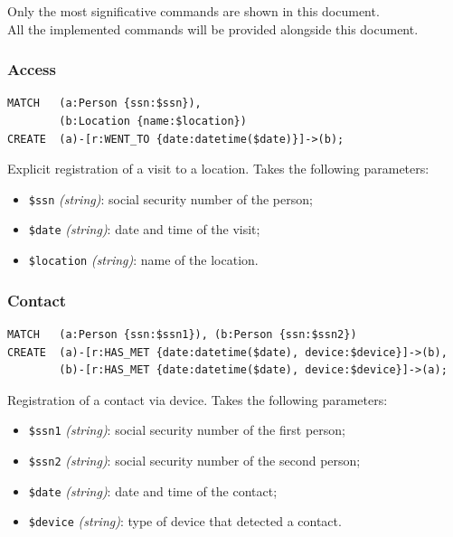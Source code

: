 \documentclass[12pt, a4paper]{article}
\begin{document}
Only the most significative commands are shown in this document. \\
All the implemented commands will be provided alongside this document.

\subsubsection{Access}

\begin{tcolorbox}[fontupper=\scriptsize]
    \begin{verbatim}
MATCH   (a:Person {ssn:$ssn}),
        (b:Location {name:$location})
CREATE  (a)-[r:WENT_TO {date:datetime($date)}]->(b);  
    \end{verbatim}
\end{tcolorbox}

\noindent %
Explicit registration of a visit to a location.
Takes the following parameters: 

\begin{itemize}
    \item \texttt{\$ssn} \emph{(string)}: social security number of the person;
    \item \texttt{\$date} \emph{(string)}: date and time of the visit;
    \item \texttt{\$location} \emph{(string)}: name of the location.
\end{itemize}

\subsubsection{Contact}

\begin{tcolorbox}[fontupper=\scriptsize]
    \begin{verbatim}
MATCH   (a:Person {ssn:$ssn1}), (b:Person {ssn:$ssn2})
CREATE  (a)-[r:HAS_MET {date:datetime($date), device:$device}]->(b), 
        (b)-[r:HAS_MET {date:datetime($date), device:$device}]->(a);
    \end{verbatim}
\end{tcolorbox}

\noindent %
Registration of a contact via device.
Takes the following parameters: 

\begin{itemize}
    \item \texttt{\$ssn1} \emph{(string)}: social security number of the 
        first person;
    \item \texttt{\$ssn2} \emph{(string)}: social security number of the
        second person;
    \item \texttt{\$date} \emph{(string)}: date and time of the contact;
    \item \texttt{\$device} \emph{(string)}: type of device that detected a 
        contact.
\end{itemize}
\end{document}
